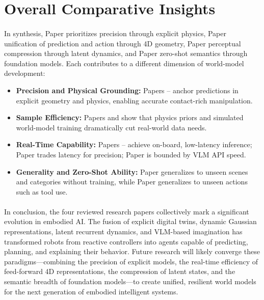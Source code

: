\documentclass[12pt,a4paper,final]{extreport}
\begin{document}
\section{Overall Comparative Insights}

\paragraph{} In synthesis, Paper \cite{p1} prioritizes precision through explicit physics, Paper \cite{p2} unification of prediction and action through 4D geometry, Paper \cite{p3} perceptual compression through latent dynamics, and Paper \cite{p4} zero-shot semantics through foundation models. Each contributes to a different dimension of world-model development:
\begin{itemize}
  \item \textbf{Precision and Physical Grounding:} Papers \cite{p1}--\cite{p2} anchor predictions in explicit geometry and physics, enabling accurate contact-rich manipulation.
  \item \textbf{Sample Efficiency:} Papers \cite{p1} and \cite{p3} show that physics priors and simulated world-model training dramatically cut real-world data needs.
  \item \textbf{Real-Time Capability:} Papers \cite{p2}--\cite{p3} achieve on-board, low-latency inference; Paper \cite{p1} trades latency for precision; Paper \cite{p4} is bounded by VLM API speed.
  \item \textbf{Generality and Zero-Shot Ability:} Paper \cite{p4} generalizes to unseen scenes and categories without training, while Paper \cite{p1} generalizes to unseen actions such as tool use.
\end{itemize}

\paragraph{}
In conclusion, the four reviewed research papers collectively mark a significant evolution in embodied AI. The fusion of explicit digital twins, dynamic Gaussian representations, latent recurrent dynamics, and VLM-based imagination has transformed robots from reactive controllers into agents capable of predicting, planning, and explaining their behavior. Future research will likely converge these paradigms---combining the precision of explicit models, the real-time efficiency of feed-forward 4D representations, the compression of latent states, and the semantic breadth of foundation models---to create unified, resilient world models for the next generation of embodied intelligent systems.
\end{document}
